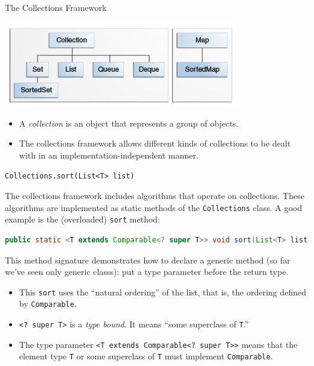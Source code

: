 \documentclass{beamer}
\begin{document}
\begin{frame}
  \titlepage
\end{frame}


\begin{frame}[fragile]{The Collections Framework}

\begin{center}
\includegraphics[width=4in]{colls-coreInterfaces.png}
\end{center}

\begin{itemize}
\item A {\it collection} is an object that represents a group of objects.
\item The collections framework allows different kinds of collections to be dealt with in an implementation-independent manner.
\end{itemize}


\end{frame}

\begin{frame}[fragile]{{\tt Collections.sort(List<T> list)}}


The collections framework includes algorithms that operate on collections.  These algorithms are implemented as static methods of the {\tt Collections} class.  A good example is the (overloaded) {\tt sort} method:
\begin{lstlisting}[language=Java]
public static <T extends Comparable<? super T>> void sort(List<T> list)
\end{lstlisting}
This method signature demonstrates how to declare a generic method (so far we've seen only generic classs): put a type parameter before the return type.
\begin{itemize}
\item This {\tt sort} uses the ``natural ordering'' of the list, that is, the ordering defined by {\tt Comparable}.
\item {\tt <? super T>} is a {\it type bound}.  It means ``some superclass of {\tt T}.''
\item The type parameter {\tt <T extends Comparable<? super T>>} means that the element type {\tt T} or some superclass of {\tt T} must implement {\tt Comparable}.
\end{itemize}


\end{frame}
\end{document}
